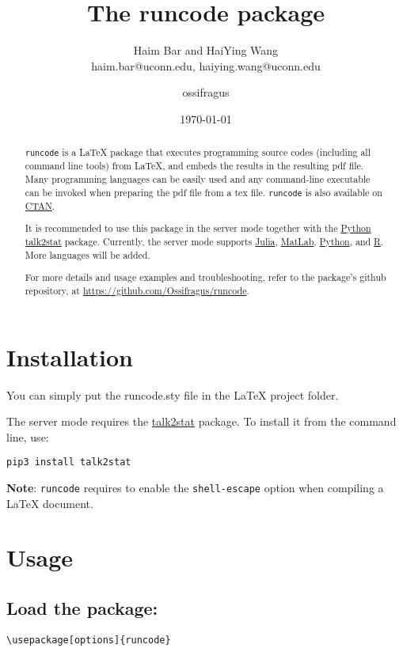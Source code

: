 \documentclass{ltxdoc}
\author{Haim Bar and HaiYing Wang \\haim.bar@uconn.edu, haiying.wang@uconn.edu}
\author{ossifragus}
\date{\today}
\title{The \textbf{runcode} package}
\begin{document}
\maketitle
\begin{abstract}

 \texttt{runcode} is a \LaTeX{} package that executes programming source codes
(including all command line tools) from \LaTeX{}, and embeds the results in
the resulting pdf file. Many programming languages can be easily used
and any command-line executable can be invoked when preparing the pdf
file from a tex file. \texttt{runcode} is also available on
\href{https://ctan.org/pkg/runcode}{CTAN}.

It is recommended to use this package in the server mode together with
the \href{https://www.python.org/}{Python}
\href{https://pypi.org/project/talk2stat/}{talk2stat} package. Currently,
the server mode supports \href{https://julialang.org/}{Julia},
\href{https://www.mathworks.com/products/matlab.html}{MatLab},
\href{https://www.python.org/}{Python}, and
\href{https://www.r-project.org/}{R}. More languages will be added.

For more details and usage examples and troubleshooting, refer to the
package’s github repository, at \url{https://github.com/Ossifragus/runcode}.

\end{abstract}

\section{Installation}
\label{installation}
You can simply put the runcode.sty file in the \LaTeX{} project folder.

The server mode requires the
\href{https://pypi.org/project/talk2stat/}{talk2stat} package. To install
it from the command line, use:

\begin{verbatim}
pip3 install talk2stat
\end{verbatim}

\textbf{Note}: \texttt{runcode} requires to enable the \texttt{shell-escape} option when
compiling a \LaTeX{} document.

\section{Usage}
\label{usage}
\subsection{Load the package:}
\label{loadthepackage}
\begin{verbatim}
\usepackage[options]{runcode}
\end{verbatim}
\end{document}
